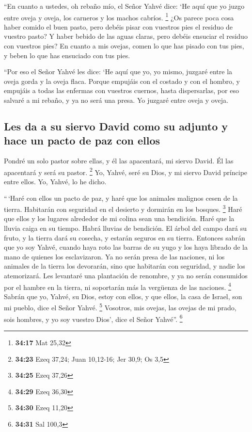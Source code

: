  ``En cuanto a ustedes, oh rebaño mío, el Señor Yahvé
dice: `He aquí que yo juzgo entre oveja y oveja, los carneros y los
machos cabríos. \footnote{\textbf{34:17} Mat 25,32}  ¿Os
parece poca cosa haber comido el buen pasto, pero debéis pisar con
vuestros pies el residuo de vuestro pasto? Y haber bebido de las aguas
claras, pero debéis ensuciar el residuo con vuestros pies?
 En cuanto a mis ovejas, comen lo que has pisado con tus
pies, y beben lo que has ensuciado con tus pies.

 ``Por eso el Señor Yahvé les dice: `He aquí que yo, yo
mismo, juzgaré entre la oveja gorda y la oveja flaca. 
Porque empujáis con el costado y con el hombro, y empujáis a todas las
enfermas con vuestros cuernos, hasta dispersarlas,  por
eso salvaré a mi rebaño, y ya no será una presa. Yo juzgaré entre oveja
y oveja.

\hypertarget{les-da-a-su-siervo-david-como-su-adjunto-y-hace-un-pacto-de-paz-con-ellos}{%
\subsection{Les da a su siervo David como su adjunto y hace un pacto de
paz con
ellos}\label{les-da-a-su-siervo-david-como-su-adjunto-y-hace-un-pacto-de-paz-con-ellos}}

 Pondré un solo pastor sobre ellas, y él las apacentará,
mi siervo David. Él las apacentará y será su pastor. \footnote{\textbf{34:23}
  Ezeq 37,24; Juan 10,12-16; Jer 30,9; Os 3,5}  Yo,
Yahvé, seré su Dios, y mi siervo David príncipe entre ellos. Yo, Yahvé,
lo he dicho.

 ``\,`Haré con ellos un pacto de paz, y haré que los
animales malignos cesen de la tierra. Habitarán con seguridad en el
desierto y dormirán en los bosques. \footnote{\textbf{34:25} Ezeq 37,26}
 Haré que ellos y los lugares alrededor de mi colina sean
una bendición. Haré que la lluvia caiga en su tiempo. Habrá lluvias de
bendición.  El árbol del campo dará su fruto, y la tierra
dará su cosecha, y estarán seguros en su tierra. Entonces sabrán que yo
soy Yahvé, cuando haya roto las barras de su yugo y los haya librado de
la mano de quienes los esclavizaron.  Ya no serán presa
de las naciones, ni los animales de la tierra los devorarán, sino que
habitarán con seguridad, y nadie los atemorizará.  Les
levantaré una plantación de renombre, y ya no serán consumidos por el
hambre en la tierra, ni soportarán más la vergüenza de las naciones.
\footnote{\textbf{34:29} Ezeq 36,30}  Sabrán que yo,
Yahvé, su Dios, estoy con ellos, y que ellos, la casa de Israel, son mi
pueblo, dice el Señor Yahvé. \footnote{\textbf{34:30} Ezeq 11,20}
 Vosotros, mis ovejas, las ovejas de mi prado, sois
hombres, y yo soy vuestro Dios', dice el Señor Yahvé''. \footnote{\textbf{34:31}
  Sal 100,3}

